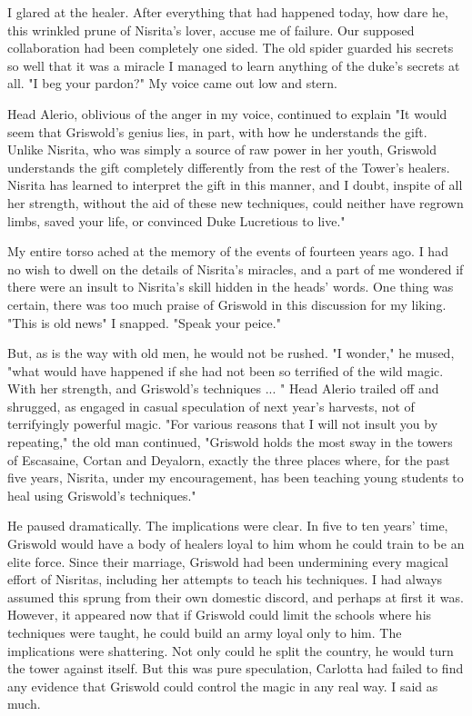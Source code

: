 \documentclass{article}
\begin{document}
I glared at the healer. After everything that had happened today, how dare he, this wrinkled prune of Nisrita's lover, accuse me of failure. Our supposed collaboration had been completely one sided. The old spider guarded his secrets so well that it was a miracle I managed to learn anything of the duke's secrets at all. "I beg your pardon?" My voice came out low and stern.

Head Alerio, oblivious of the anger in my voice, continued to explain "It would seem that Griswold's genius lies, in part, with how he understands the gift. Unlike Nisrita, who was simply a source of raw power in her youth, Griswold understands the gift completely differently from the rest of the Tower's healers. Nisrita has learned to interpret the gift in this manner, and I doubt, inspite of all her strength, without the aid of these new techniques, could neither have regrown limbs, saved your life, or convinced Duke Lucretious to live."

My entire torso ached at the memory of the events of fourteen years ago. I had no wish to dwell on the details of Nisrita's miracles, and a part of me wondered if there were an insult to Nisrita's skill hidden in the heads' words. One thing was certain, there was too much praise of Griswold in this discussion for my liking. "This is old news" I snapped. "Speak your peice."

But, as is the way with old men, he would not be rushed. "I wonder," he mused, "what would have happened if she had not been so terrified of the wild magic. With her strength, and Griswold's  techniques ... " Head Alerio trailed off and shrugged, as engaged in casual speculation of next year's harvests, not of terrifyingly powerful magic. "For various reasons that I will not insult you by repeating," the old man continued, "Griswold holds the most sway in the towers of Escasaine, Cortan and Deyalorn, exactly the three places where, for the past five years, Nisrita, under my encouragement, has been teaching young students to heal using Griswold's techniques."

He paused dramatically. The implications were clear. In five to ten years' time, Griswold would have a body of healers loyal to him whom he could train to be an elite force. Since their marriage, Griswold had been undermining every magical effort of Nisritas, including her attempts to teach his techniques. I had always assumed this sprung from their own domestic discord, and perhaps at first it was. However, it appeared now that if Griswold could limit the schools where his techniques were taught, he could build an army loyal only to him. The implications were shattering. Not only could he split the country, he would turn the tower against itself. But this was pure speculation, Carlotta had failed to find any evidence that Griswold could control the magic in any real way.  I said as much.
\end{document}

